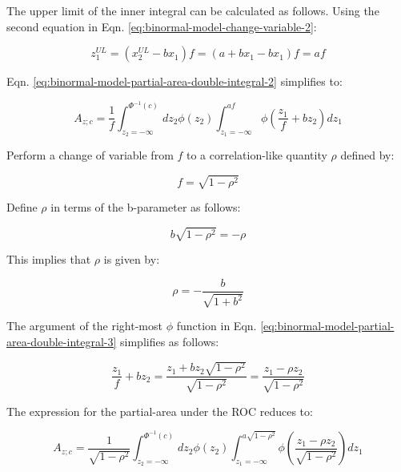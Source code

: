 \documentclass[
]{book}
\begin{document}
The upper limit of the inner integral can be calculated as follows. Using the second equation in Eqn. \eqref{eq:binormal-model-change-variable-2}:

\begin{equation}
z_{1}^{UL}=\left ( x_{2}^{UL} - b x_1\right ) f = \left ( a+b x_1-bx_1 \right ) f = af
\label{eq:binormal-model-upper-limit-simplified}
\end{equation}

Eqn. \eqref{eq:binormal-model-partial-area-double-integral-2} simplifies to:

\begin{equation}
A_{z;c} = \frac{1}{f}\int_{z_2=-\infty}^{\Phi^{-1}\left ( c \right )} dz_2 \phi\left ( z_2 \right ) \int_{z_1=-\infty}^{af} \phi\left ( \frac{z_1}{f} + b z_2\right ) dz_1
\label{eq:binormal-model-partial-area-double-integral-3}
\end{equation}

Perform a change of variable from \(f\) to a correlation-like quantity \(\rho\) defined by:

\begin{equation}
f= \sqrt{1-\rho^2}
\label{eq:binormal-model-partial-area-rho2}
\end{equation}

Define \(\rho\) in terms of the b-parameter as follows:

\begin{equation}
b\sqrt{1-\rho^2} = - \rho
\label{eq:binormal-model-partial-b-rho}
\end{equation}

This implies that \(\rho\) is given by:

\begin{equation}
\rho = - \frac{b}{\sqrt{1+b^2}}
\label{eq:binormal-model-rho-final1}
\end{equation}

The argument of the right-most \(\phi\) function in Eqn. \eqref{eq:binormal-model-partial-area-double-integral-3} simplifies as follows:

\begin{equation}
\frac{z_1}{f} + bz_2 = \frac{z_1 + b z_2 \sqrt{1-\rho^2}}{\sqrt{1-\rho^2}} = \frac{z_1 - \rho z_2}{\sqrt{1-\rho^2}}
\label{eq:binormal-model-partial-simplification}
\end{equation}

The expression for the partial-area under the ROC reduces to:

\begin{equation}
A_{z;c} = \frac{1}{\sqrt{1-\rho^2}}\int_{z_2=-\infty}^{\Phi^{-1}\left ( c \right )} dz_2 \phi\left ( z_2 \right ) \int_{z_1=-\infty}^{a\sqrt{1-\rho^2}} \phi\left ( \frac{z_1 - \rho z_2}{\sqrt{1-\rho^2}}\right ) dz_1
\label{eq:binormal-model-partial-area-double-integral-4}
\end{equation}
\end{document}
